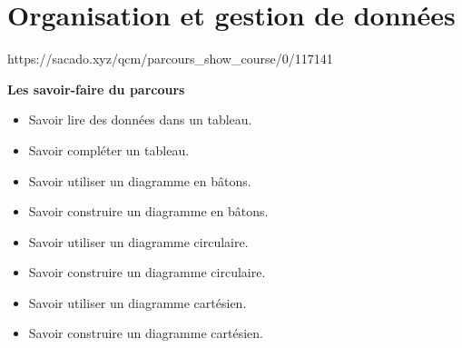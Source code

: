 \chapter{Organisation et gestion de données}
{https://sacado.xyz/qcm/parcours_show_course/0/117141}
{
\begin{CpsCol}
 \textbf{Les savoir-faire du parcours}
 \begin{itemize}
 \item Savoir lire des données dans un tableau.
 \item Savoir compléter un tableau.
 \item Savoir utiliser un diagramme en bâtons.
 \item Savoir construire un diagramme en bâtons.
 \item Savoir utiliser un diagramme circulaire.
 \item Savoir construire un diagramme circulaire.
 \item Savoir utiliser un diagramme cartésien.
 \item Savoir construire un diagramme cartésien.
 \end{itemize}
\end{CpsCol}
}

